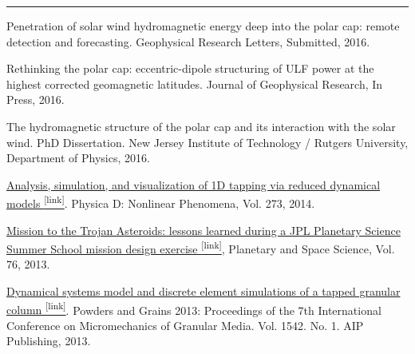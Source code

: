\documentclass[10pt]{article}
\newcommand{\ressection}[1]{\noindent{\large\textbf{#1}}
\vspace{2pt}\hrule\vspace{4pt}}
\begin{document}
\vspace{0.2cm}
\ressection{Peer-Reviewed Papers}
\vspace{-0.8em}
\begin{itemize*}

  \item
    Penetration of solar wind hydromagnetic
    energy deep into the polar cap: remote detection and forecasting. 
    Geophysical Research Letters,
    Submitted, 2016.

  \item
    Rethinking the polar cap: eccentric-dipole structuring of ULF power
    at the highest corrected geomagnetic latitudes. Journal of Geophysical
    Research, In Press, 2016.

  \item
    The hydromagnetic structure of the polar cap and its interaction
    with the solar wind. PhD Dissertation. New Jersey Institute of
    Technology / Rutgers University, Department of Physics, 2016.

  \item \label{itm:gran1}
    \href{http://www.sciencedirect.com/science/article/pii/S0167278914000189}{ Analysis, 
    simulation, and visualization of 1D tapping via
    reduced dynamical models \textsuperscript{\tiny{[link]}}}. Physica D: Nonlinear Phenomena, Vol.
    273, 2014.

  \item
    \href{http://www.sciencedirect.com/science/article/pii/S0032063312003741}{Mission 
    to the Trojan Asteroids: lessons learned
    during a JPL Planetary Science Summer School mission design
    exercise \textsuperscript{\tiny{[link]}}}, Planetary and Space Science, Vol. 76, 2013.

  \item 
    \href{http://scitation.aip.org/content/aip/proceeding/aipcp/10.1063/1.4811931}{Dynamical
    systems model and discrete element simulations of a tapped granular
    column \textsuperscript{\tiny{[link]}}}. Powders and Grains 2013: Proceedings of
    the 7th International Conference on Micromechanics of Granular
    Media. Vol. 1542. No. 1. AIP Publishing, 2013.


\end{itemize*}
\end{document}
